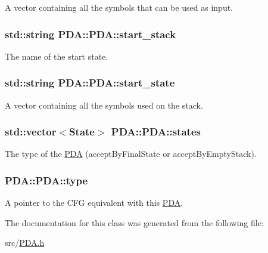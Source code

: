 \-A vector containing all the symbols that can be used as input. 

\hypertarget{classPDA_1_1PDA_a253c02338c616cd8e8882f71e2a5666f}{
\subsubsection[{start\-\_\-stack}]{\setlength{\rightskip}{0pt plus 5cm}std\-::string {\bf \-P\-D\-A\-::\-P\-D\-A\-::start\-\_\-stack}}}\label{d1/dc5/classPDA_1_1PDA_a253c02338c616cd8e8882f71e2a5666f}


\-The name of the start state. 

\hypertarget{classPDA_1_1PDA_af346efb9a6812d704d69299eef9262e6}{
\subsubsection[{start\-\_\-state}]{\setlength{\rightskip}{0pt plus 5cm}std\-::string {\bf \-P\-D\-A\-::\-P\-D\-A\-::start\-\_\-state}}}\label{d1/dc5/classPDA_1_1PDA_af346efb9a6812d704d69299eef9262e6}


\-A vector containing all the symbols used on the stack. 

\hypertarget{classPDA_1_1PDA_a38d40f2c938f18d396ea2b13ca361271}{
\subsubsection[{states}]{\setlength{\rightskip}{0pt plus 5cm}std\-::vector$<${\bf \-State}$>$ {\bf \-P\-D\-A\-::\-P\-D\-A\-::states}}}\label{d1/dc5/classPDA_1_1PDA_a38d40f2c938f18d396ea2b13ca361271}


\-The type of the \hyperlink{classPDA_1_1PDA}{\-P\-D\-A} (accept\-By\-Final\-State or accept\-By\-Empty\-Stack). 

\hypertarget{classPDA_1_1PDA_a15524b46d2be399f384b0f236ccb38f4}{
\subsubsection[{type}]{ {\bf \-P\-D\-A\-::\-P\-D\-A\-::type}}}\label{d1/dc5/classPDA_1_1PDA_a15524b46d2be399f384b0f236ccb38f4}


\-A pointer to the \-C\-F\-G equivalent with this \hyperlink{classPDA_1_1PDA}{\-P\-D\-A}. 



\-The documentation for this class was generated from the following file\-:\begin{DoxyCompactItemize}
\item 
src/\hyperlink{PDA_8h}{\-P\-D\-A.\-h}\end{DoxyCompactItemize}
